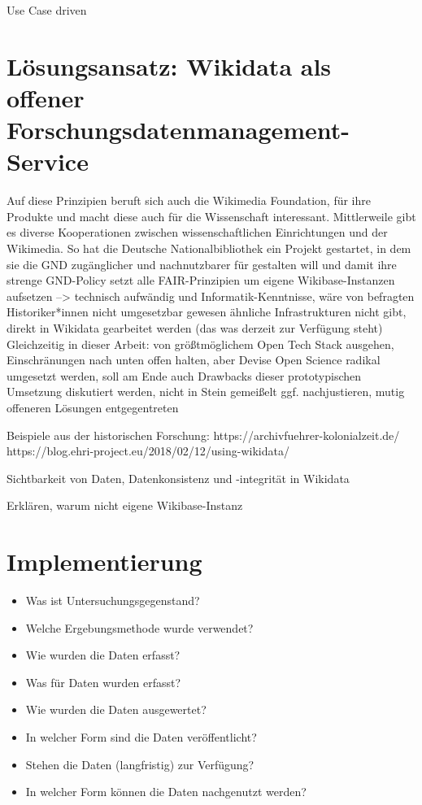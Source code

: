 \onehalfspacing

Use Case driven

\section{Lösungsansatz: Wikidata als offener Forschungsdatenmanagement-Service}
Auf diese Prinzipien beruft sich auch die Wikimedia Foundation, für ihre Produkte und macht diese auch für die Wissenschaft interessant. Mittlerweile gibt es diverse Kooperationen zwischen wissenschaftlichen Einrichtungen und der Wikimedia. So hat die Deutsche Nationalbibliothek ein Projekt gestartet, in dem sie die GND zugänglicher und nachnutzbarer für gestalten will und damit ihre strenge GND-Policy
setzt alle FAIR-Prinzipien um
eigene Wikibase-Instanzen aufsetzen --> technisch aufwändig und Informatik-Kenntnisse, wäre von befragten Historiker*innen nicht umgesetzbar gewesen
ähnliche Infrastrukturen nicht gibt, direkt in Wikidata gearbeitet werden (das was derzeit zur Verfügung steht)
Gleichzeitig in dieser Arbeit: von größtmöglichem Open Tech Stack ausgehen, Einschränungen nach unten offen halten, aber Devise Open Science radikal umgesetzt werden, soll am Ende auch Drawbacks dieser prototypischen Umsetzung diskutiert werden, nicht in Stein gemeißelt ggf. nachjustieren, mutig offeneren Lösungen entgegentreten

Beispiele aus der historischen Forschung:
https://archivfuehrer-kolonialzeit.de/
https://blog.ehri-project.eu/2018/02/12/using-wikidata/


Sichtbarkeit von Daten, Datenkonsistenz und -integrität in Wikidata

Erklären, warum nicht eigene Wikibase-Instanz

\section{Implementierung}

\begin{itemize}
    \item Was ist Untersuchungsgegenstand?
    \item Welche Ergebungsmethode wurde verwendet?
    \item Wie wurden die Daten erfasst?
    \item Was für Daten wurden erfasst?
    \item Wie wurden die Daten ausgewertet?
    \item In welcher Form sind die Daten veröffentlicht?
    \item Stehen die Daten (langfristig) zur Verfügung?
    \item In welcher Form können die Daten nachgenutzt werden?
    \end{itemize}
    
